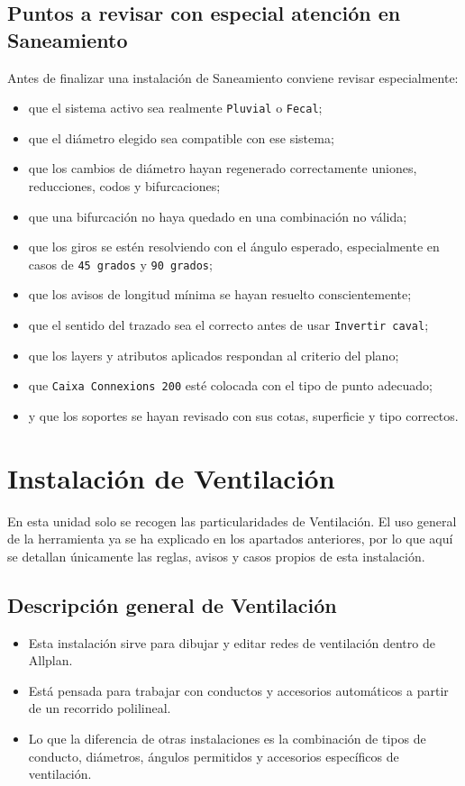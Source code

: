 \documentclass[12pt,a4paper]{article}
\begin{document}
\subsection{Puntos a revisar con especial atención en Saneamiento}

Antes de finalizar una instalación de Saneamiento conviene revisar especialmente:

\begin{itemize}
\item que el sistema activo sea realmente \texttt{Pluvial} o \texttt{Fecal};
\item que el diámetro elegido sea compatible con ese sistema;
\item que los cambios de diámetro hayan regenerado correctamente uniones, reducciones, codos y bifurcaciones;
\item que una bifurcación no haya quedado en una combinación no válida;
\item que los giros se estén resolviendo con el ángulo esperado, especialmente en casos de \texttt{45 grados} y \texttt{90 grados};
\item que los avisos de longitud mínima se hayan resuelto conscientemente;
\item que el sentido del trazado sea el correcto antes de usar \texttt{Invertir caval};
\item que los layers y atributos aplicados respondan al criterio del plano;
\item que \texttt{Caixa Connexions 200} esté colocada con el tipo de punto adecuado;
\item y que los soportes se hayan revisado con sus cotas, superficie y tipo correctos.
\end{itemize}

\section{Instalación de Ventilación}

En esta unidad solo se recogen las particularidades de Ventilación. El uso general de la herramienta ya se ha explicado en los apartados anteriores, por lo que aquí se detallan únicamente las reglas, avisos y casos propios de esta instalación.

\subsection{Descripción general de Ventilación}

\begin{itemize}
\item Esta instalación sirve para dibujar y editar redes de ventilación dentro de Allplan.
\item Está pensada para trabajar con conductos y accesorios automáticos a partir de un recorrido polilineal.
\item Lo que la diferencia de otras instalaciones es la combinación de tipos de conducto, diámetros, ángulos permitidos y accesorios específicos de ventilación.
\end{itemize}
\end{document}
